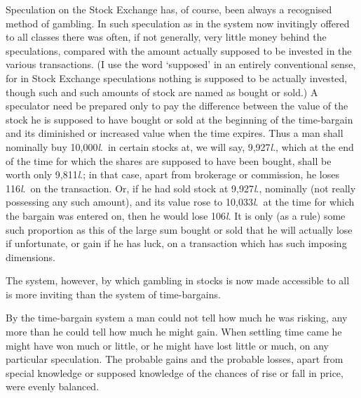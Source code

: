 \documentclass[letterpaper,12pt,oneside,openany]{memoir}
\begin{document}
Speculation on the Stock Exchange has, of course,
been always a recognised method of gambling. In such
speculation as in the system now invitingly offered to
all classes there was often, if not generally, very little
money behind the speculations, compared with the
amount actually supposed to be invested in the various
transactions. (I use the word `supposed' in an entirely
conventional sense, for in Stock Exchange speculations
nothing is supposed to be actually invested, though such
and such amounts of stock are named as bought or
sold.) A speculator need be prepared only to pay the
difference between the value of the stock he is supposed
to have bought or sold at the beginning of the time-bargain
and its diminished or increased value when the
time expires. Thus a man shall nominally buy 10,000\textit{l}.\ in
certain stocks at, we will say, 9,927\textit{l}., which at the
end of the time for which the shares are supposed to
have been bought, shall be worth only 9,811\textit{l}.; in that
case, apart from brokerage or commission, he loses 116\textit{l}.\ on
the transaction. Or, if he had sold stock at 9,927\textit{l}.,
nominally (not really possessing any such amount), and
its value rose to 10,033\textit{l}.\ at the time for which the
bargain was entered on, then he would lose 106\textit{l}. It is
only (as a rule) some such proportion as this of the large
sum bought or sold that he will actually lose if unfortunate,
or gain if he has luck, on a transaction which has
such imposing dimensions.

The system, however, by which gambling in stocks
is now made accessible to all is more inviting than the
system of time-bargains.

By the time-bargain system a man could not tell
how much he was risking, any more than he could
tell how much he might gain. When settling time
came he might have won much or little, or he might
have lost little or much, on any particular speculation.
The probable gains and the probable losses, apart
from special knowledge or supposed knowledge of the
chances of rise or fall in price, were evenly balanced.
\end{document}
